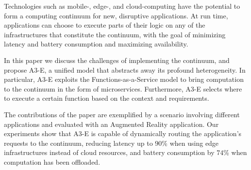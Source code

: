 Technologies such as mobile-, edge-, and cloud-computing have the potential to form a computing continuum for new, disruptive applications. At run time, applications can choose to execute parts of their logic on any of the infrastructures that constitute the continuum, with the goal of minimizing latency and battery consumption and maximizing availability.

In this paper we discuss the challenges of implementing the continuum, and propose A3-E, a unified model that abstracts away its profound heterogeneity. In particular, A3-E exploits the Functions-as-a-Service model to bring computation to the continuum in the form of microservices. Furthermore, A3-E selects where to execute a certain function based on the context and requirements.

The contributions of the paper are exemplified by a scenario involving different applications and evaluated with an Augmented Reality application. Our experiments show that A3-E is capable of dynamically routing the application's requests to the continuum, reducing latency up to $90$\% when using edge infrastructures instead of cloud resources, and battery consumption by $74$\% when computation has been offloaded.






